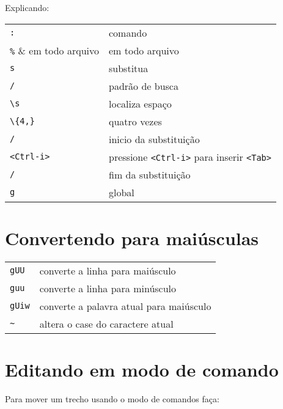 Explicando:
\begin{table}[htb]\begin{center} \begin{tabular}{ll} \hline
    \verb|:| & comando\\
    \verb|%| & em todo arquivo \\
    \verb|s| & substitua \\
    \verb|/| & padrão de busca\\
    \verb|\s| & localiza espaço\\
    \verb|\{4,}| & quatro vezes\\
    \verb|/| & inicio da substituição\\
    \verb|<Ctrl-i>| & pressione \verb|<Ctrl-i>| para inserir \verb|<Tab>|\\
    \verb|/| & fim da substituição\\
    \verb|g| & global\\
\hline \end{tabular}\end{center}\end{table}

\section{Convertendo para maiúsculas}
\label{sec:Convertendo para maiúsculas}

\begin{table}[htb]\begin{center} \begin{tabular}{ll} \hline
     \verb|gUU| & converte a linha para maiúsculo\\
     \verb|guu| & converte a linha para minúsculo\\
     \verb|gUiw| &  converte a palavra atual para maiúsculo\\
     \verb|~| & altera o case do caractere atual\\
\hline \end{tabular}\end{center}\end{table}

\section{Editando em modo de comando}
\label{sec:Editando em modo de comando}

Para mover um trecho usando o modo de comandos faça:

